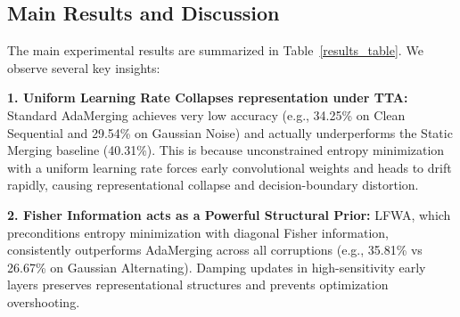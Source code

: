 \documentclass{article}
\theoremstyle{plain}
\theoremstyle{definition}
\theoremstyle{remark}
\begin{document}
\begin{table}[t]
\begin{minipage}{0.49\textwidth}
\caption{Ablation study accuracies (\%) of FP-CA components.}
\label{ablation_table}
\vskip 0.1in
\begin{small}
\begin{sc}
\end{sc}
\end{small}
\end{minipage}
\vskip -0.1in
\end{table}

\subsection{Main Results and Discussion}
The main experimental results are summarized in Table~\ref{results_table}. We observe several key insights:

\textbf{1. Uniform Learning Rate Collapses representation under TTA:} Standard AdaMerging achieves very low accuracy (e.g., 34.25\% on Clean Sequential and 29.54\% on Gaussian Noise) and actually underperforms the Static Merging baseline (40.31\%). This is because unconstrained entropy minimization with a uniform learning rate forces early convolutional weights and heads to drift rapidly, causing representational collapse and decision-boundary distortion.

\textbf{2. Fisher Information acts as a Powerful Structural Prior:} LFWA, which preconditions entropy minimization with diagonal Fisher information, consistently outperforms AdaMerging across all corruptions (e.g., 35.81\% vs 26.67\% on Gaussian Alternating). Damping updates in high-sensitivity early layers preserves representational structures and prevents optimization overshooting.
\end{document}
